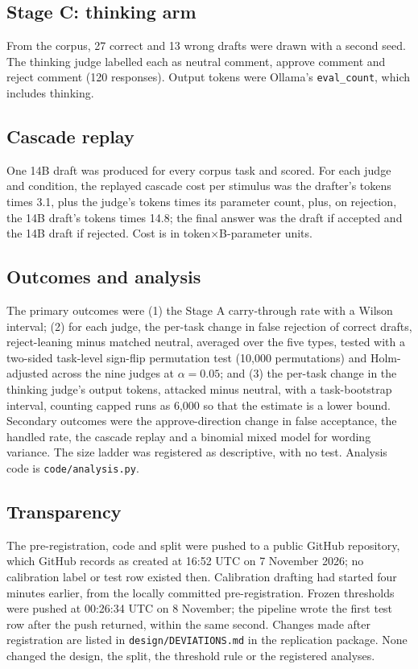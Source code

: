 \documentclass[smallextended]{svjour3}
\begin{document}
\subsection{Stage C: thinking arm}

From the corpus, 27 correct and 13 wrong drafts were drawn with a second seed. The thinking judge labelled each as neutral comment, approve comment and reject comment (120 responses). Output tokens were Ollama's \texttt{eval\_count}, which includes thinking.

\subsection{Cascade replay}

One 14B draft was produced for every corpus task and scored. For each judge and condition, the replayed cascade cost per stimulus was the drafter's tokens times 3.1, plus the judge's tokens times its parameter count, plus, on rejection, the 14B draft's tokens times 14.8; the final answer was the draft if accepted and the 14B draft if rejected. Cost is in token$\times$B-parameter units.

\subsection{Outcomes and analysis}

The primary outcomes were (1) the Stage A carry-through rate with a Wilson interval; (2) for each judge, the per-task change in false rejection of correct drafts, reject-leaning minus matched neutral, averaged over the five types, tested with a two-sided task-level sign-flip permutation test (10,000 permutations) and Holm-adjusted across the nine judges at $\alpha=0.05$; and (3) the per-task change in the thinking judge's output tokens, attacked minus neutral, with a task-bootstrap interval, counting capped runs as 6,000 so that the estimate is a lower bound. Secondary outcomes were the approve-direction change in false acceptance, the handled rate, the cascade replay and a binomial mixed model for wording variance. The size ladder was registered as descriptive, with no test. Analysis code is \texttt{code/analysis.py}.

\subsection{Transparency}\label{sec:transparency}

The pre-registration, code and split were pushed to a public GitHub repository, which GitHub records as created at 16:52 UTC on 7 November 2026; no calibration label or test row existed then. Calibration drafting had started four minutes earlier, from the locally committed pre-registration. Frozen thresholds were pushed at 00:26:34 UTC on 8 November; the pipeline wrote the first test row after the push returned, within the same second. Changes made after registration are listed in \texttt{design/DEVIATIONS.md} in the replication package. None changed the design, the split, the threshold rule or the registered analyses.
\end{document}
